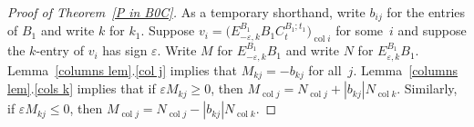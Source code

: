 \documentclass{amsart}
\theoremstyle{definition}
\theoremstyle{remark}
\numberwithin{equation}{section}
\newcommand{\ep}{\varepsilon}
\newcommand{\col}{\operatorname{col}}
\newcommand{\set}[1]{{\lbrace #1 \rbrace}}
\newcommand{\0}{{\mathbf{0}}}
\begin{document}
\begin{proof}[Proof of Theorem~\ref{P in B0C}]
As a temporary shorthand, write $b_{ij}$ for the entries of $B_1$ and write $k$ for $k_1$.
Suppose $v_i=\bigl(E^{B_1}_{-\ep,k}B_1C_t^{B_1;t_1}\bigr)_{\col i}$ for some~$i$ and suppose the $k$-entry of $v_i$ has sign $\ep$.
Write $M$ for $E^{B_1}_{-\ep,k}B_1$ and write $N$ for $E^{B_1}_{\ep,k}B_1$.
Lemma~\ref{columns lem}.\ref{col j} implies that $M_{kj}=-b_{kj}$ for all~$j$.
Lemma~\ref{columns lem}.\ref{cols k} implies that if $\ep M_{kj}\ge0$, then $M_{\col j}=N_{\col j}+|b_{kj}|N_{\col k}$.
Similarly, if $\ep M_{kj}\le0$, then $M_{\col j}=N_{\col j}-|b_{kj}|N_{\col k}$.



\end{proof}
\end{document}

